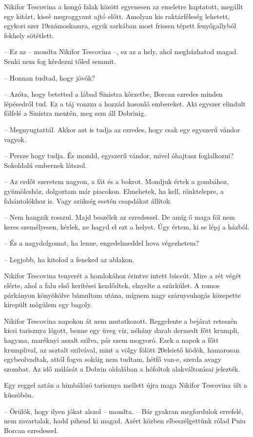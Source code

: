\documentclass{IEEEtran}
\begin{document}
Nikifor Tescovina a kongó falak között egyenesen az emeletre kaptatott,
megállt egy kitárt, kissé megroggyant ajtó előtt. Amolyan kis raktárféleség
lehetett, egykori szer 19számoskamra, egyik sarkában most frissen tépett
fenyőgallyból fekhely sötétlett.

– Ez az – mondta Nikifor Tescovina –, ez az a hely, ahol meghúzhatod magad.
Senki nem fog kérdezni tőled semmit.

– Honnan tudtad, hogy jövök?

– Azóta, hogy betetted a lábad Sinistra körzetbe, Borcan ezredes minden
lépésedről tud. Ez a táj vonzza a hozzád hasonló embereket. Aki egyszer
elindult fölfelé a Sinistra mentén, meg sem áll Dobrinig.

– Megnyugtattál. Akkor azt is tudja az ezredes, hogy csak egy egyszerű vándor
vagyok.

– Persze hogy tudja. És mondd, egyszerű vándor, mivel óhajtasz foglalkozni?
Sokoldalú embernek látszol.

– Az erdőt szeretem nagyon, a fát és a bokrot. Mondjuk értek a gombához,
gyümölcshöz, dolgoztam már piacokon. Elmehetek, ha kell, rönktelepre, a
fahántolókhoz is. Vagy szükség esetén csapdákat állítok.

– Nem hangzik rosszul. Majd beszélek az ezredessel. De amíg ő maga föl nem
keres személyesen, kérlek, ne hagyd el ezt a helyet. Úgy értem, ki se lépj a
házból.

– És a nagydolgomat, ha lenne, engedelmeddel hova végezhetem?

– Legjobb, ha kitolod a feneked az ablakon.

Nikifor Tescovina tenyerét a homlokához érintve intett búcsút. Mire a rét
végét elérte, ahol a falu első kerítései kezdődtek, elnyelte a szürkület. A
romos párkányon könyökölve bámultam utána, mígnem nagy szárnysuhogás közepette
kirepült mögülem egy bagoly.

Nikifor Tescovina napokon át nem mutatkozott. Reggelente a bejárat reteszén
kicsi tarisznya lógott, benne egy üveg víz, néhány darab dermedt főtt krumpli,
hagyma, maréknyi aszalt szilva, pár szem mogyoró. Ezek a napok a főtt
krumplival, az asztalt szilvával, mint a völgy fölött 20elsiető ködök,
hamarosan egybeolvadtak, attól fogva sokáig nem tudtam, hétfő van-e, szerda
avagy szombat. Az idő múlását a Dobrin oldalában a hófoltok alakváltozásai
jelezték.

Egy reggel aztán a himbálózó tarisznya mellett újra maga Nikifor Tescovina ült
a küszöbön.

– Örülök, hogy ilyen jókat alszol – mondta. – Bár gyakran megfordulok
errefelé, nem zavartalak, hadd pihend ki magad. Azért közben elbeszélgettünk
rólad Puiu Borcan ezredessel.
\end{document}
